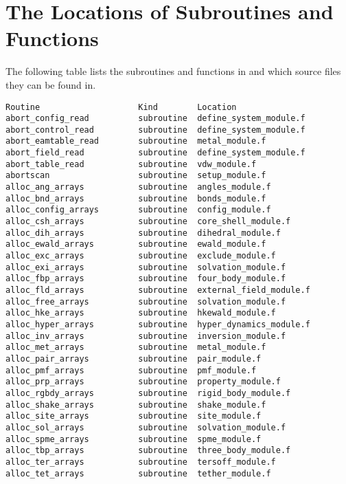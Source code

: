 \section*{The Locations of Subroutines and Functions}

The following table lists the subroutines and functions in \D{} and
which source files they can be found in.

\begin{verbatim}
Routine                    Kind        Location
abort_config_read          subroutine  define_system_module.f    
abort_control_read         subroutine  define_system_module.f    
abort_eamtable_read        subroutine  metal_module.f            
abort_field_read           subroutine  define_system_module.f    
abort_table_read           subroutine  vdw_module.f              
abortscan                  subroutine  setup_module.f            
alloc_ang_arrays           subroutine  angles_module.f           
alloc_bnd_arrays           subroutine  bonds_module.f            
alloc_config_arrays        subroutine  config_module.f           
alloc_csh_arrays           subroutine  core_shell_module.f       
alloc_dih_arrays           subroutine  dihedral_module.f         
alloc_ewald_arrays         subroutine  ewald_module.f            
alloc_exc_arrays           subroutine  exclude_module.f          
alloc_exi_arrays           subroutine  solvation_module.f        
alloc_fbp_arrays           subroutine  four_body_module.f        
alloc_fld_arrays           subroutine  external_field_module.f   
alloc_free_arrays          subroutine  solvation_module.f        
alloc_hke_arrays           subroutine  hkewald_module.f          
alloc_hyper_arrays         subroutine  hyper_dynamics_module.f   
alloc_inv_arrays           subroutine  inversion_module.f        
alloc_met_arrays           subroutine  metal_module.f            
alloc_pair_arrays          subroutine  pair_module.f             
alloc_pmf_arrays           subroutine  pmf_module.f              
alloc_prp_arrays           subroutine  property_module.f         
alloc_rgbdy_arrays         subroutine  rigid_body_module.f       
alloc_shake_arrays         subroutine  shake_module.f            
alloc_site_arrays          subroutine  site_module.f             
alloc_sol_arrays           subroutine  solvation_module.f        
alloc_spme_arrays          subroutine  spme_module.f             
alloc_tbp_arrays           subroutine  three_body_module.f       
alloc_ter_arrays           subroutine  tersoff_module.f          
alloc_tet_arrays           subroutine  tether_module.f           

\end{verbatim}
